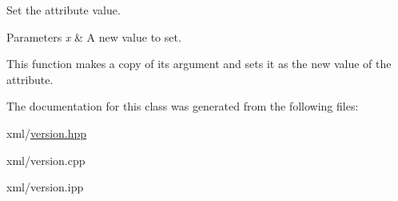 Set the attribute value. 


\begin{DoxyParams}{Parameters}
{\em x} & A new value to set.\\
\hline
\end{DoxyParams}
This function makes a copy of its argument and sets it as the new value of the attribute. 

The documentation for this class was generated from the following files:\begin{DoxyCompactItemize}
\item 
xml/\hyperlink{version_8hpp}{version.hpp}\item 
xml/version.cpp\item 
xml/version.ipp\end{DoxyCompactItemize}
